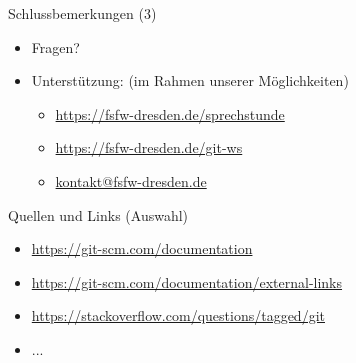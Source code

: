 \documentclass{beamer}
\begin{document}
\begin{frame}[label=uj]{Schlussbemerkungen (3)}
\begin{itemize}
 \item Fragen?\\[10mm]
 \item Unterstützung: {\tiny (im Rahmen unserer Möglichkeiten)}
   \begin{itemize}
   \item \url{https://fsfw-dresden.de/sprechstunde}
   \item \url{https://fsfw-dresden.de/git-ws}
   \bigskip
   \item {\Large \url{kontakt@fsfw-dresden.de}}
   \end{itemize}
\end{itemize}

\end{frame}


\begin{frame}[label=link10]{Quellen und Links (Auswahl)}
\tiny
\begin{itemize}
 \item \url{https://git-scm.com/documentation}
 \item \url{https://git-scm.com/documentation/external-links}
 \item \url{https://stackoverflow.com/questions/tagged/git}
\item ...
\end{itemize}
\end{frame}

\end{document}

